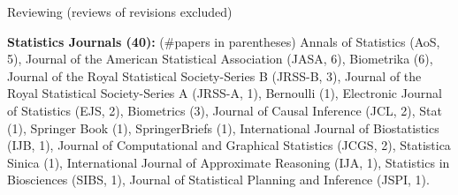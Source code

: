 \documentclass{article}
\begin{document}
\vspace{5mm}











\vspace{3mm}
\begin{large}
\noindent Reviewing (reviews of revisions excluded)
\end{large}

\vspace{2mm}
\noindent \textbf{Statistics Journals (40): }(\#papers in parentheses) Annals of Statistics (AoS, 5), Journal of the American Statistical Association (JASA, 6), Biometrika (6), Journal of the Royal Statistical Society-Series B (JRSS-B, 3), Journal of the Royal Statistical Society-Series A (JRSS-A, 1), Bernoulli (1), Electronic Journal of Statistics (EJS, 2), Biometrics (3), Journal of Causal Inference (JCL, 2), Stat (1), Springer Book (1), SpringerBriefs (1), International Journal of Biostatistics (IJB, 1), Journal of Computational and Graphical Statistics (JCGS, 2), Statistica Sinica (1), International Journal of Approximate Reasoning (IJA, 1), Statistics in Biosciences (SIBS, 1), Journal of Statistical Planning and Inference (JSPI, 1).
\end{document}
